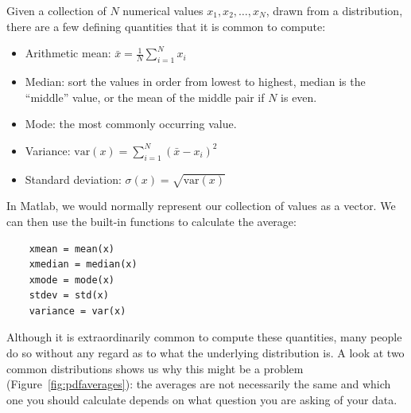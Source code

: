 \documentclass[12pt,a4paper]{tufte-handout}
\begin{document}
Given a collection of $N$ numerical values ${x_1, x_2,\dots, x_N}$, drawn from a distribution, there are a few defining quantities that it is common to compute:
  \begin{itemize}
    \item Arithmetic mean: $\bar x = \frac{1}{N}\sum_{i=1}^N x_i$
    \item Median: sort the values in order from lowest to highest, median is the ``middle'' value, or the mean of the middle pair if $N$ is even.
    \item Mode: the most commonly occurring value.
    \item Variance: $\mbox{var}(x)=\sum_{i=1}^N \left(\bar x -x_i\right)^2$
    \item Standard deviation: $\sigma(x)=\sqrt{\mbox{var}(x)}$
  \end{itemize}

  In Matlab, we would normally represent our collection of values as a vector. We can then use the built-in functions to calculate the average:
  \begin{lstlisting}
    xmean = mean(x)
    xmedian = median(x)
    xmode = mode(x)
    stdev = std(x)
    variance = var(x)
\end{lstlisting}

Although it is extraordinarily common to compute these quantities, many people do so without any regard as to what the underlying distribution is. A look at two common distributions shows us why this might be a problem (Figure~\ref{fig:pdfaverages}): the averages are not necessarily the same and which one you should calculate depends on what question you are asking of your data.
\end{document}

